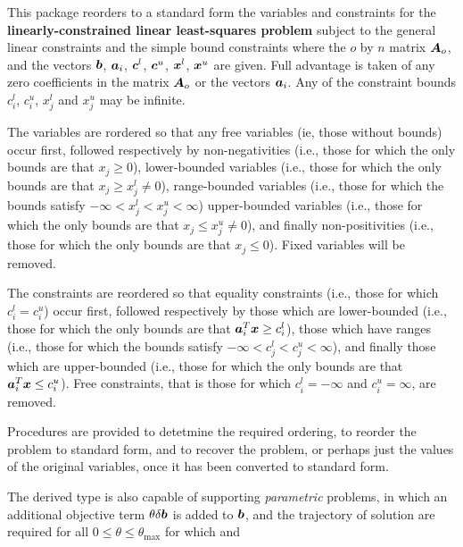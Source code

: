 \documentclass{galahad}
\begin{document}
\galheader


\galsummary
This package reorders to a standard form the variables and constraints
for the {\bf linearly-constrained linear least-squares problem}
subject to the general linear constraints
and the simple bound constraints
where the $o$ by $n$ matrix ${\bm{A}}_o$, and the 
vectors ${\bm{b}}$, ${\bm{a}}_{i}$, ${\bm{c}}^{l}$, ${\bm{c}}^{u}$, ${\bm{x}}^{l}$, 
${\bm{x}}^{u}$ are given.
Full advantage is taken of any zero coefficients in the matrix ${\bm{A}}_o$ or the
vectors ${\bm{a}}_{i}$. 
Any of the constraint bounds $c_{i}^{l}$, $c_{i}^{u}$, 
$x_{j}^{l}$ and $x_{j}^{u}$ may be infinite.

The variables are rordered so that any
free variables (ie, those without bounds) occur first, followed
respectively by 
non-negativities (i.e., those for which the only
bounds are that $x_j \geq 0$),
lower-bounded variables (i.e., those for which the only
bounds are that $x_j \geq x_j^l \neq 0$),
range-bounded variables (i.e., those for which the 
bounds satisfy $- \infty < x_j^l < x_j^u < \infty$)
upper-bounded variables (i.e., those for which the only
bounds are that $x_j \leq x_j^u \neq 0$), and finally
non-positivities (i.e., those for which the only
bounds are that $x_j \leq 0$).
Fixed variables will be removed. 

The constraints are reordered so that equality constraints (i.e., those
for which $c_i^l = c_i^u$) occur first, followed 
respectively by those 
which are lower-bounded (i.e., those for which the only
bounds are that ${\bm{a}}_i^T {\bm{x}} \geq c_i^l$),
those which have ranges (i.e., those for which the 
bounds satisfy 
$- \infty < c_j^l < c_j^u < \infty$), 
and finally those which are upper-bounded (i.e., those for which the only
bounds are that ${\bm{a}}_i^T {\bm{x}} \leq c_i^u$).
Free constraints, that is those for which 
$c_i^l = - \infty$ and $c_i^u = \infty$, are removed.

Procedures are provided to detetmine the required ordering, to
reorder the problem to standard form, and
to recover the problem, or perhaps just the values of
the original variables, once it has been converted to standard form.

The derived type is also capable of supporting {\em parametric}
problems, in which an additional objective
term $\theta \delta {\bm{b}}$ is added to ${\bm{b}}$, and the trajectory of 
solution are required for all $0 \leq \theta \leq \theta_{\max}$ 
for which
and 
\end{document}
